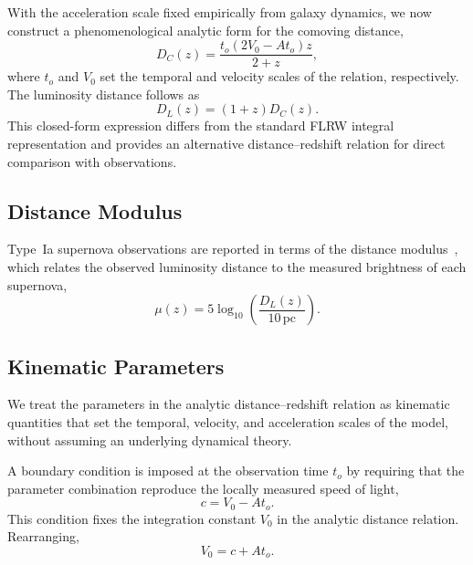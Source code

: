 \documentclass[fleqn,usenatbib]{mnras}
\begin{document}
With the acceleration scale fixed empirically from galaxy dynamics, we now construct a phenomenological analytic form for the comoving distance,
\begin{equation}
D_C(z) = \frac{t_o\left(2V_0 - A t_o\right) z}{2 + z},
\end{equation}
where $t_o$ and $V_0$ set the temporal and velocity scales of the relation, respectively. The luminosity distance follows as
\begin{equation}
D_L(z) = (1+z)D_C(z).
\end{equation}
This closed-form expression differs from the standard FLRW integral representation and provides an alternative distance--redshift relation for direct comparison with observations.

\subsection{Distance Modulus}

Type~Ia supernova observations are reported in terms of the distance modulus~\cite{Tripp1998}, which relates the observed luminosity distance to the measured brightness of each supernova,
\begin{equation}
\mu(z) = 5\log_{10}\!\left(\frac{D_L(z)}{10\,\mathrm{pc}}\right).
\end{equation}

\subsection{Kinematic Parameters}

We treat the parameters in the analytic distance--redshift relation as kinematic quantities that set the temporal, velocity, and acceleration scales of the model, without assuming an underlying dynamical theory.

A boundary condition is imposed at the observation time $t_o$ by requiring that the parameter combination reproduce the locally measured speed of light,
\begin{equation}
c = V_0 - A t_o .
\label{eq:co_definition}
\end{equation}
This condition fixes the integration constant $V_0$ in the analytic distance relation. Rearranging,
\begin{equation}
V_0 = c + A t_o .
\label{eq:velocity_boundary_condition}
\end{equation}
\end{document}

